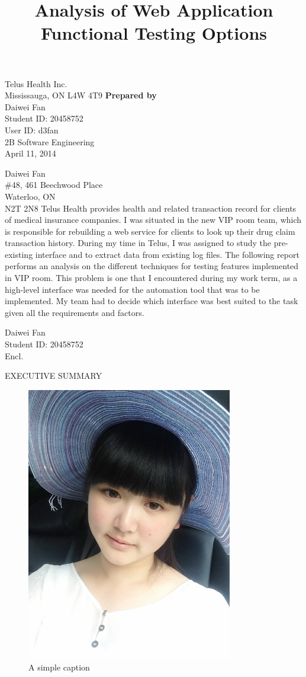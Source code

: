 \documentclass[12pt]{article}
\begin{document}
\title{Analysis of Web Application Functional Testing Options}
{
	Telus Health Inc.\\
	Mississauga, ON L4W 4T9
}
{
	\textbf{Prepared by}\\[2ex]
	
	Daiwei Fan\\
	Student ID: 20458752\\
	User ID: d3fan\\
	2B Software Engineering\\
	April 11, 2014
}


{
	\noindent
	Daiwei Fan\\
	\#48, 461 Beechwood Place\\
	Waterloo, ON\\
	N2T 2N8
}
{
	Telus Health provides health and related transaction record for clients of medical insurance companies. I was situated in the new VIP room team, which is responsible for rebuilding a web service for clients to look up their drug claim transaction history. During my time in Telus, I was assigned to study the pre-existing interface and to extract data from existing log files.
}
{
	The following report performs an analysis on the different techniques for testing features implemented in VIP room. This problem is one that I encountered during my work term, as a high-level interface was needed for the automation tool that was to be implemented. My team had to decide which interface was best suited to the task given all the requirements and factors.
}
{
	
}
{
	Daiwei Fan\\
	Student ID: 20458752\\[2ex]
	Encl.
}


EXECUTIVE SUMMARY

\begin{figure}[ht!]
\centering
\includegraphics[width=90mm]{img/bbb.jpg}
\caption{A simple caption}
\label{overflow}
\end{figure}
\end{document}
